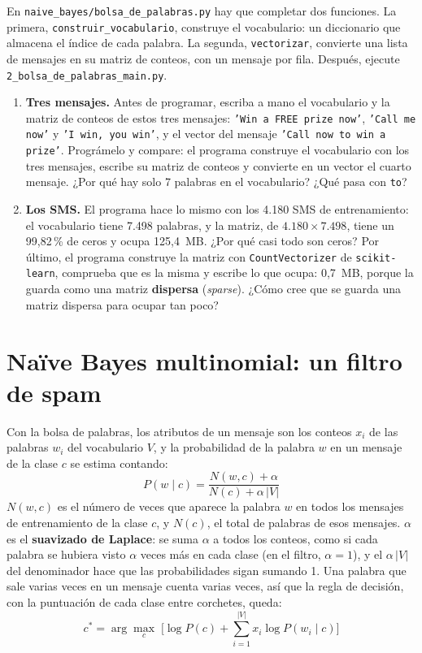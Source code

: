 \documentclass{article}
\begin{document}
\begin{exercise}[breakable]\label{ej:bolsa}
En \texttt{naive\_bayes/bolsa\_de\_palabras.py} hay que completar dos funciones. La primera, \texttt{construir\_vocabulario}, construye el vocabulario: un diccionario que almacena el índice de cada palabra. La segunda, \texttt{vectorizar}, convierte una lista de mensajes en su matriz de conteos, con un mensaje por fila. Después, ejecute \texttt{2\_bolsa\_de\_palabras\_main.py}.
\begin{enumerate}
    \item[a)] \textbf{Tres mensajes.} Antes de programar, escriba a mano el vocabulario y la matriz de conteos de estos tres mensajes: \texttt{'Win a FREE prize now'}, \texttt{'Call me now'} y \texttt{'I win, you win'}, y el vector del mensaje \texttt{'Call now to win a prize'}. Prográmelo y compare: el programa construye el vocabulario con los tres mensajes, escribe su matriz de conteos y convierte en un vector el cuarto mensaje. ¿Por qué hay solo 7 palabras en el vocabulario? ¿Qué pasa con \texttt{to}?
    \item[b)] \textbf{Los SMS.} El programa hace lo mismo con los 4.180 SMS de entrenamiento: el vocabulario tiene 7.498 palabras, y la matriz, de $4.180 \times 7.498$, tiene un 99,82\,\% de ceros y ocupa 125,4~MB. ¿Por qué casi todo son ceros? Por último, el programa construye la matriz con \texttt{CountVectorizer} de \texttt{scikit-learn}, comprueba que es la misma y escribe lo que ocupa: 0,7~MB, porque la guarda como una matriz \textbf{dispersa} (\textit{sparse}). ¿Cómo cree que se guarda una matriz dispersa para ocupar tan poco?
\end{enumerate}
\end{exercise}


\section{Naïve Bayes multinomial: un filtro de spam}
Con la bolsa de palabras, los atributos de un mensaje son los conteos $x_i$ de las palabras $w_i$ del vocabulario $V$, y la probabilidad de la palabra $w$ en un mensaje de la clase $c$ se estima contando:
\[
P(w \mid c) = \frac{N(w, c) + \alpha}{N(c) + \alpha\,|V|}
\]
$N(w, c)$ es el número de veces que aparece la palabra $w$ en todos los mensajes de entrenamiento de la clase $c$, y $N(c)$, el total de palabras de esos mensajes. $\alpha$ es el \textbf{suavizado de Laplace}: se suma $\alpha$ a todos los conteos, como si cada palabra se hubiera visto $\alpha$ veces más en cada clase (en el filtro, $\alpha = 1$), y el $\alpha\,|V|$ del denominador hace que las probabilidades sigan sumando 1. Una palabra que sale varias veces en un mensaje cuenta varias veces, así que la regla de decisión, con la puntuación de cada clase entre corchetes, queda:
\[
c^* = \arg\max_c \; \Big[ \log P(c) + \sum_{i=1}^{|V|} x_i \log P(w_i \mid c) \Big]
\]
\end{document}

